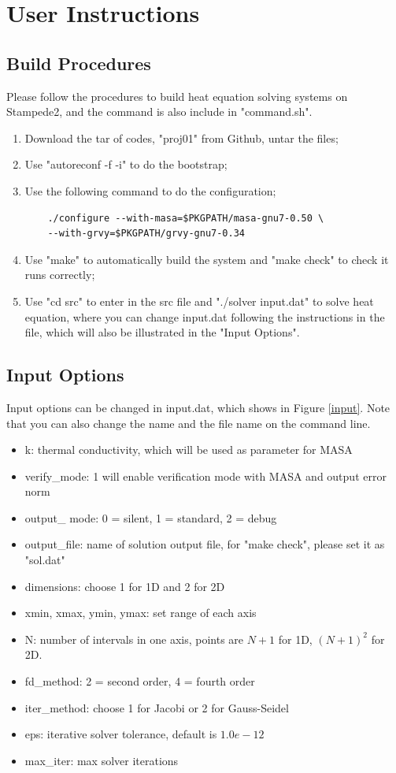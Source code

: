 \documentclass[a4paper]{article}
\begin{document}
\newpage
\section{User Instructions}
\subsection{Build Procedures}
Please follow the procedures to build heat equation solving systems on Stampede2, and the command is also include in "command.sh".
\begin{enumerate}
    \item Download the tar of codes, "proj01" from Github, untar the files;
    \item Use "autoreconf -f -i" to do the bootstrap;
    \item Use the following command to do the configuration;
    \begin{verbatim}
    ./configure --with-masa=$PKGPATH/masa-gnu7-0.50 \
    --with-grvy=$PKGPATH/grvy-gnu7-0.34
    \end{verbatim}
    \item Use "make" to automatically build the system and "make check" to check it runs correctly;
    \item Use "cd src" to enter in the src file and "./solver input.dat" to solve heat equation, where you can change input.dat following the instructions in the file, which will also be illustrated in the "Input Options".
    
\end{enumerate}
\subsection{Input Options}
Input options can be changed in input.dat, which shows in Figure \ref{input}.
Note that you can also change the name and the file name on the command line.

\begin{itemize}
    \item k: thermal conductivity, which will be used as parameter for MASA
    \item verify\_mode: 1 will enable verification mode with MASA and output error norm
    \item output\_ mode: 0 = silent, 1 = standard, 2 = debug
    \item output\_file: name of solution output file, for "make check", please set it as "sol.dat"
    \item dimensions: choose 1 for 1D and 2 for 2D
    \item xmin, xmax, ymin, ymax: set range of each axis
    \item N: number of intervals in one axis, points are $N+1$ for 1D, $(N+1)^2$ for 2D.
    \item fd\_method: 2 = second order, 4 = fourth order
    \item iter\_method: choose 1 for Jacobi or 2 for Gauss-Seidel
    \item eps: iterative solver tolerance, default is $1.0e-12$
    \item max\_iter: max solver iterations
\end{itemize}
\end{document}

